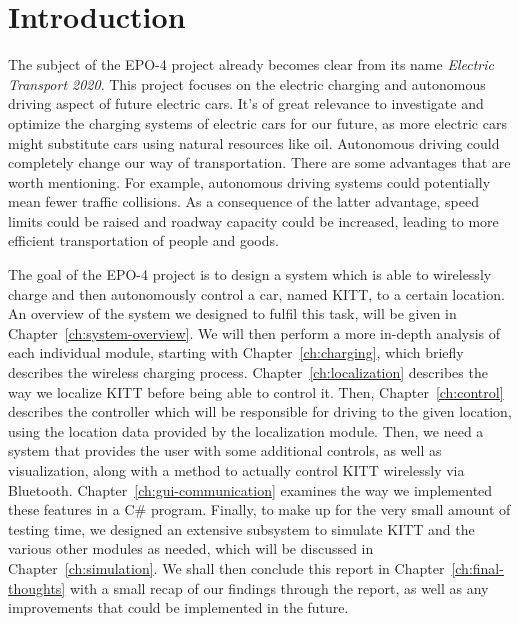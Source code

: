 \documentclass[11pt,titlepage]{report}
\begin{document}
\chapter{Introduction}
The subject of the EPO-4 project already becomes clear from its name \textit{Electric Transport 2020}. This project focuses on the electric charging and autonomous driving aspect of future electric cars. It's of great relevance to investigate and optimize the charging systems of electric cars for our future, as more electric cars might substitute cars using natural resources like oil. Autonomous driving could completely change our way of transportation. There are some advantages that are worth mentioning. For example, autonomous driving systems could potentially mean fewer traffic collisions. As a consequence of the latter advantage, speed limits could be raised and roadway capacity could be increased, leading to more efficient transportation of people and goods.

The goal of the EPO-4 project is to design a system which is able to wirelessly charge and then autonomously control a car, named KITT, to a certain location. An overview of the system we designed to fulfil this task, will be given in Chapter~\ref{ch:system-overview}. We will then perform a more in-depth analysis of each individual module, starting with Chapter~\ref{ch:charging}, which briefly describes the wireless charging process. Chapter~\ref{ch:localization} describes the way we localize KITT before being able to control it. Then, Chapter~\ref{ch:control} describes the controller which will be responsible for driving to the given location, using the location data provided by the localization module. Then, we need a system that provides the user with some additional controls, as well as visualization, along with a method to actually control KITT wirelessly via Bluetooth. Chapter~\ref{ch:gui-communication} examines the way we implemented these features in a C\# program. Finally, to make up for the very small amount of testing time, we designed an extensive subsystem to simulate KITT and the various other modules as needed, which will be discussed in Chapter~\ref{ch:simulation}. We shall then conclude this report in Chapter~\ref{ch:final-thoughts} with a small recap of our findings through the report, as well as any improvements that could be implemented in the future.
\end{document}
